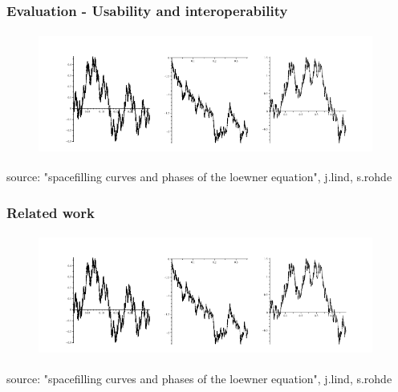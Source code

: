 \documentclass[10pt, compress]{beamer}
\begin{document}
\begin{frame}[fragile]
  \frametitle{Evaluation - Usability and interoperability}

  
\begin{figure}
  \centering
 \includegraphics[width=11cm,height=4cm]{intro2.png}
\end{figure}
\tiny
source: "spacefilling curves and phases of the loewner equation", j.lind, s.rohde
\normalsize
\end{frame}


\begin{frame}[fragile]
  \frametitle{Related work}

  

\begin{figure}
  \centering
 \includegraphics[width=11cm,height=4cm]{intro2.png}
\end{figure}
\tiny
source: "spacefilling curves and phases of the loewner equation", j.lind, s.rohde
\normalsize
\end{frame}

\end{document}
